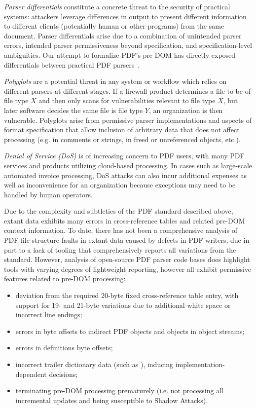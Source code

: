 \emph{Parser differentials} constitute a concrete threat to the
security of practical systems: attackers leverage differences in
output to present different information to different clients
(potentially human or other programs) from the same document.
%
Parser differentials arise due to a combination of unintended parser
errors, intended parser permissiveness beyond specification, and
specification-level ambiguities.
%
Our attempt to formalize PDF's pre-DOM has directly exposed
differentials between practical PDF parsers~\cite{dualStartXref}.

\emph{Polyglots} are a potential threat in any system or workflow
which relies on different parsers at different stages. If a firewall
product determines a file to be of file type $X$ and then only scans
for vulnerabilities relevant to file type $X$, but later software
decides the same file is file type $Y$, an organization is then
vulnerable.
%
Polyglots arise from permissive parser implementations and aspects of
format specification that allow inclusion of arbitrary data that does
not affect processing (e.g. in comments or strings, in freed or
unreferenced objects, etc.).

\emph{Denial of Service (DoS)} is of increasing concern to PDF users,
with many PDF services and products utilizing cloud-based processing.
%
In cases such as large-scale automated invoice processing, DoS attacks
can also incur additional expenses as well as inconvenience for an
organization because exceptions may need to be handled by human
operators.

Due to the complexity and subtleties of the PDF standard described
above, extant data exhibits many errors in cross-reference tables and
related pre-DOM context information.
%
To date, there has not been a comprehensive analysis of PDF file
structure faults in extant data caused by defects in PDF writers, due
in part to a lack of tooling that comprehensively reports all
variations from the standard.
%
However, analysis of open-source PDF parser code bases does highlight
tools with varying degrees of lightweight reporting, however all
exhibit permissive features related to pre-DOM processing:
%
\begin{itemize}
\item deviation from the required 20-byte fixed cross-reference table
  entry, with support for 19- and 21-byte variations due to additional
  white space or incorrect line endings;
\item errors in byte offsets to indirect PDF objects and objects in
  object streams;
\item errors in definitions  byte offsets;
\item incorrect trailer dictionary data (such as ),
  inducing implementation-dependent decisions;
\item terminating pre-DOM processing prematurely (i.e. not processing
  all incremental updates and being susceptible to Shadow Attacks).
\end{itemize}

